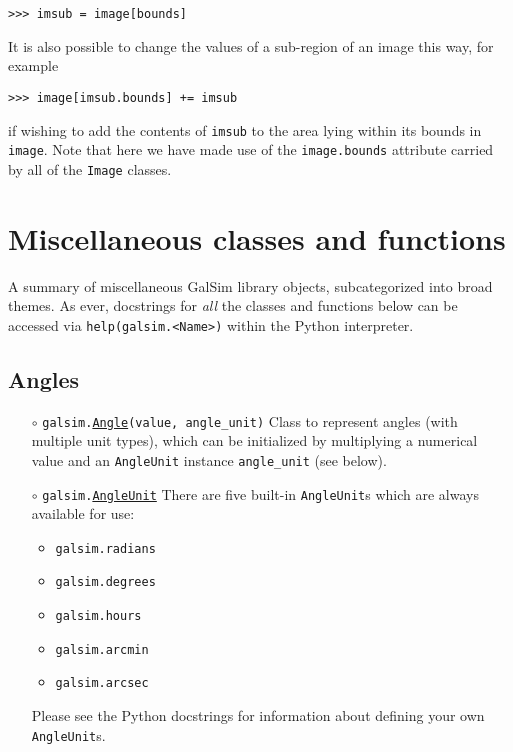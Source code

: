 \documentclass[preprint,10pt]{../../devel/modules/aastex}
\begin{document}
\texttt{>>> imsub = image[bounds]}

It is also possible to change the values of a sub-region of an image
this way, for example

\texttt{>>> image[imsub.bounds] += imsub}

if wishing to add the contents of \texttt{imsub} to the area lying
within its bounds in \texttt{image}.  Note that here we have made use of
the \texttt{image.bounds} attribute carried by all of the \texttt{Image}
classes.

\section{Miscellaneous classes and functions}\label{sect:misc}

A summary of miscellaneous GalSim library objects, subcategorized into
broad themes.  As ever, docstrings for \emph{all} the classes and
functions below can be accessed via \texttt{help(galsim.<Name>)}
within the Python interpreter.

\subsection{Angles}\label{sect:angles}

\begin{itemize}

  \item[$\circ$] 
  \texttt{galsim.\href{http://galsim-developers.github.io/GalSim/classgalsim_1_1_angle.html}{Angle}(value, angle\_unit)} 
    \newline
    Class to represent angles (with multiple unit types),
    which can be initialized by multiplying a numerical
    value and an \texttt{AngleUnit} instance \texttt{angle\_unit} (see
    below).

  \item[$\circ$] 
  \texttt{galsim.\href{http://galsim-developers.github.io/GalSim/classgalsim_1_1_angle_unit.html}{AngleUnit}} 
    \newline 
    There are five built-in \texttt{AngleUnit}s which are
    always available for use:
    \begin{itemize}
      \item \texttt{galsim.radians}
      \item \texttt{galsim.degrees}
      \item \texttt{galsim.hours}
      \item \texttt{galsim.arcmin}
      \item \texttt{galsim.arcsec}
    \end{itemize}
    Please see the Python docstrings for information about defining your
    own \texttt{AngleUnit}s.

\end{itemize}
\end{document}
